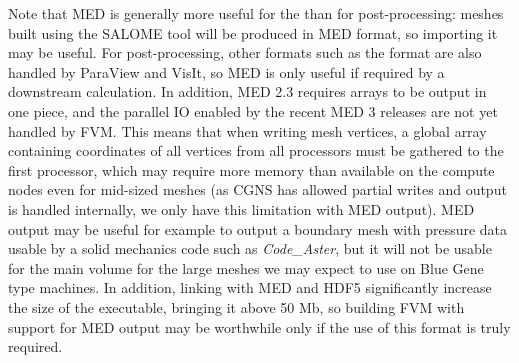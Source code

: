 \documentclass[a4paper,10pt,twoside]{article}
\begin{document}

Note that MED is generally more useful for the \pcs than for post-processing:
meshes built using the SALOME tool will be produced in MED format, so
importing it may be useful. For post-processing, other formats such
as the \ensight format are also handled by ParaView and VisIt, so
MED is only useful if required by a downstream calculation.
In addition, MED 2.3 requires arrays to be output in one piece, and
the parallel IO enabled by the recent MED 3 releases are not yet
handled by FVM. This means that when writing mesh vertices, a global
array containing coordinates of all vertices from all processors
must be gathered to the first processor, which may require more memory
than available on the compute nodes even for mid-sized meshes
(as CGNS has allowed partial writes and \ensight output is handled
internally, we only have this limitation with MED output).
MED output may be useful for example to output a boundary mesh
with pressure data usable by a solid mechanics code such as
\emph{Code\_Aster}, but it will not be usable for the main volume
for the large meshes we may expect to use on Blue Gene type machines.
In addition, linking with MED and HDF5 significantly increase
the size of the \CS executable, bringing it above 50 Mb,
so building FVM with support for MED output may be worthwhile
only if the use of this format is truly required.
\end{document}
